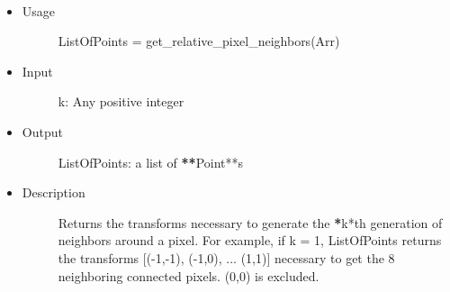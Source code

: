\documentclass[letterpaper,10pt,oneside]{sphinxmanual}
\begin{document}
\begin{fulllineitems}
\label{index:libcelegans.get_relative_pixel_neighbors}~\begin{itemize}
\item {} \begin{description}
\item[{Usage}] \leavevmode
ListOfPoints = get\_relative\_pixel\_neighbors(Arr)

\end{description}

\item {} \begin{description}
\item[{Input}] \leavevmode
k: Any positive integer

\end{description}

\item {} \begin{description}
\item[{Output}] \leavevmode
ListOfPoints:  a list of {\color{red}\bfseries{}**}Point**s

\end{description}

\item {} \begin{description}
\item[{Description}] \leavevmode
Returns the transforms necessary to generate the {\color{red}\bfseries{}*}k*th generation of 
neighbors around a pixel.  For example, if k = 1, ListOfPoints returns
the transforms {[}(-1,-1), (-1,0), ... (1,1){]} necessary to get the 8 
neighboring connected pixels.  (0,0) is excluded.

\end{description}

\end{itemize}

\end{fulllineitems}

\end{document}

